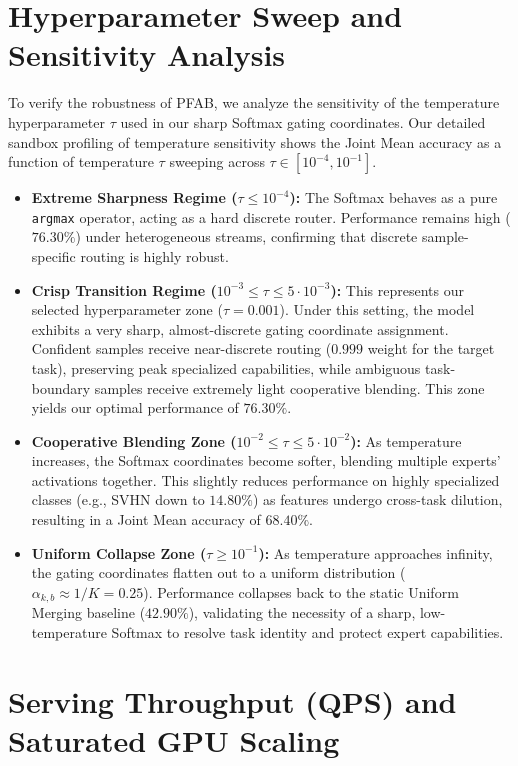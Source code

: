 \documentclass{article}
\theoremstyle{plain}
\theoremstyle{definition}
\theoremstyle{remark}
\begin{document}
\section{Hyperparameter Sweep and Sensitivity Analysis}
\label{app:sensitivity}

To verify the robustness of \textsc{PFAB}, we analyze the sensitivity of the temperature hyperparameter $\tau$ used in our sharp Softmax gating coordinates. Our detailed sandbox profiling of temperature sensitivity shows the Joint Mean accuracy as a function of temperature $\tau$ sweeping across $\tau \in [10^{-4}, 10^{-1}]$.

\begin{itemize}
  \item \textbf{Extreme Sharpness Regime ($\tau \le 10^{-4}$):} The Softmax behaves as a pure \texttt{argmax} operator, acting as a hard discrete router. Performance remains high ($76.30\%$) under heterogeneous streams, confirming that discrete sample-specific routing is highly robust.
  \item \textbf{Crisp Transition Regime ($10^{-3} \le \tau \le 5\cdot 10^{-3}$):} This represents our selected hyperparameter zone ($\tau = 0.001$). Under this setting, the model exhibits a very sharp, almost-discrete gating coordinate assignment. Confident samples receive near-discrete routing ($0.999$ weight for the target task), preserving peak specialized capabilities, while ambiguous task-boundary samples receive extremely light cooperative blending. This zone yields our optimal performance of $76.30\%$.
  \item \textbf{Cooperative Blending Zone ($10^{-2} \le \tau \le 5\cdot 10^{-2}$):} As temperature increases, the Softmax coordinates become softer, blending multiple experts' activations together. This slightly reduces performance on highly specialized classes (e.g., SVHN down to $14.80\%$) as features undergo cross-task dilution, resulting in a Joint Mean accuracy of $68.40\%$.
  \item \textbf{Uniform Collapse Zone ($\tau \ge 10^{-1}$):} As temperature approaches infinity, the gating coordinates flatten out to a uniform distribution ($\alpha_{k, b} \approx 1/K = 0.25$). Performance collapses back to the static Uniform Merging baseline ($42.90\%$), validating the necessity of a sharp, low-temperature Softmax to resolve task identity and protect expert capabilities.
\end{itemize}

\section{Serving Throughput (QPS) and Saturated GPU Scaling}
\label{app:throughput}
\end{document}
